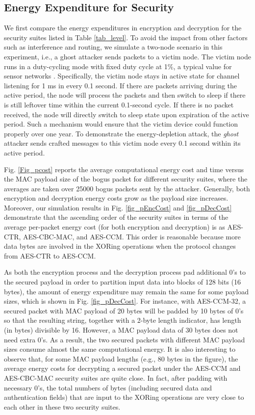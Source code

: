 \documentclass[10pt,journal,cspaper,compsoc]{IEEEtran}
\begin{document}
\subsection{Energy Expenditure for Security}\label{sec:sim:energyperpacket}
We first compare the energy expenditures in encryption and decryption for the security suites listed in Table \ref{tab_level}. To avoid the impact from other factors such as interference and routing, we simulate a two-node scenario in this experiment, i.e., a ghost attacker sends packets to a victim node.  The victim node runs in a duty-cycling mode with fixed duty cycle at 1\%, a typical value for sensor networks \cite{liu2009cmac}. Specifically, the victim node stays in active state for channel listening for 1 ms in every 0.1 second. If there are packets arriving during the active period, the node will process the packets and then switch to sleep if there is still leftover time within the current 0.1-second cycle. If there is no packet received, the node will directly switch to sleep state upon expiration of the active period. Such a mechanism would ensure that the victim device could function properly over one year. To demonstrate the energy-depletion attack, the {\em ghost} attacker sends crafted messages to this victim node every 0.1 second within its active period.

Fig. \ref{Fig_pcost} reports the average computational energy cost and time versus the MAC payload size of the bogus packet for different security suites, where the averages are taken over 25000 bogus packets sent by the attacker. Generally, both encryption and decryption energy costs grow as the payload size increases. Moreover, our simulation results in Fig. \ref{fig_pEncCost} and \ref{fig_pDecCost} demonstrate that the ascending order of the security suites in terms of the average per-packet energy cost (for both encryption and decryption) is as AES-CTR, AES-CBC-MAC, and AES-CCM. This order is reasonable because more data bytes are involved in the XORing operations when the protocol changes from AES-CTR to AES-CCM.

As both the encryption process and the decryption process pad additional 0's to the secured payload in order to partition input data into blocks of 128 bits (16 bytes), the amount of energy expenditure may remain the same for some payload sizes, which is shown in Fig. \ref{fig_pDecCost}. For instance, with AES-CCM-32, a secured packet with MAC payload of 20 bytes will be padded by 10 bytes of 0's so that the resulting string, together with a 2-byte length indicator, has length (in bytes) divisible by 16. However, a MAC payload data of 30 bytes does not need extra 0's. As a result, the two secured packets with different MAC payload sizes consume almost the same computational energy. It is also interesting to observe that, for some MAC payload lengths (e.g., 80 bytes in the figure), the average energy costs for decrypting a secured packet under the AES-CCM and AES-CBC-MAC security suites are quite close. In fact, after padding with necessary 0's, the total numbers of bytes (including secured data and authentication fields) that are input to the XORing operations are very close to each other in these two security suites.
\end{document}
